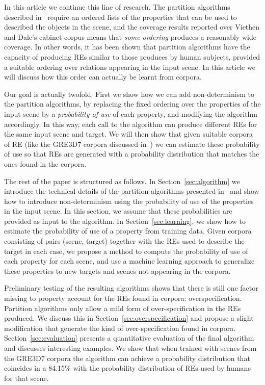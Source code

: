 In this article we continue this line of research.  The partition algorithms described in~\cite{arec2:2008:Areces,arec:usin11} require an 
ordered lists of the properties that can be used to described the objects in the scene, and the coverage results reported over Viethen and 
Dale's cabinet corpus means that \emph{some ordering} produces a reasonably wide coverage.  In other words, it has been shown that partition algorithms have the capacity of producing REs similar to those produces by human subjects, provided a suitable ordering over relations appearing 
in the input scene. In this article we will discuss how this order can actually be learnt from corpora.  

Our goal is actually twofold. First we show how we can add non-determinism to the partition algorithms, by replacing the fixed ordering 
over the properties of the input scene by a \emph{probability of use} of each property, and modifying the algorithm accordingly.  
In this way, each call to the algorithm can produce different REs for the same input scene and target.  We will then show that given suitable corpora of RE (like the GRE3D7 corpora discussed in~\cite{viet:gene11}) we can estimate these probability of use so that REs are generated with a probability distribution that matches the ones found in the corpora.  

The rest of the paper is structured as follows. In Section~\ref{sec:algorithm} we introduce the technical details of the 
partition algorithms presented in~\cite{arec2:2008:Areces,arec:usin11} and show how to introduce non-determinism using 
the probability of use of the properties in the input scene.  In this section, we assume that these probabilities are provided as 
input to the algorithm. In Section~\ref{sec:learning}, we show how to estimate the 
probability of use of a property from training data. Given corpora consisting of pairs (scene, target) together with the REs used to 
describe the target in each case, we propose a method to compute the probability of use of each property for each scene, and use a machine learning approach to generalize these properties to new targets and scenes not appearing in the corpora. 

Preliminary testing of the resulting algorithms shows that there is still one factor missing to property account for the REs found in corpora: overspecification.  Partition algorithms only allow a mild form of over-specification in the REs produced.  We discuss this in Section~\ref{sec:overspecification} and propose a slight modification that generate the kind of over-specification found in corpora. 
Section~\ref{sec:evaluation} presents a quantitative evaluation of the final algorithm and discusses interesting examples. We show that when trained with scenes from the GRE3D7 corpora the algorithm can achieve a probability distribution that coincides in a 84.15\% with the probability distribution of REs used by humans for that scene. 

